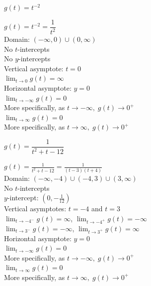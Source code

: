 \documentclass{ximera}
\begin{document}
\begin{question}
\begin{problem}
\begin{solution}
\begin{center} 
\end{center}
\end{solution}
\end{problem} 

\begin{problem}
$g(t) = t^{-2}$

\begin{solution}
$g(t) = t^{-2} = \dfrac{1}{t^{2}}$\\
Domain: $(-\infty, 0) \cup (0, \infty)$\\
No $t$-intercepts\\
No $y$-intercepts\\
Vertical asymptote: $t = 0$\\
$\lim_{t \rightarrow 0} g(t) = \infty$ \\
Horizontal asymptote: $y = 0$\\
$\lim_{t \rightarrow -\infty} g(t) = 0$\\
More specifically, as $t \rightarrow -\infty, \; g(t) \rightarrow 0^{+}$\\
$\lim_{t \rightarrow \infty} g(t) = 0$\\
More specifically, as $t \rightarrow \infty, \; g(t) \rightarrow 0^{+}$\\

\begin{center} 
\end{center}
\end{solution}
\end{problem} 

\begin{problem}
$g(t) = \dfrac{1}{t^{2} + t - 12}$

\begin{solution}
$g(t) = \frac{1}{t^{2} + t - 12} = \frac{1}{(t - 3)(t + 4)}$\\
Domain: $(-\infty, -4) \cup (-4, 3) \cup (3, \infty)$\\
No $t$-intercepts\\
$y$-intercept: $(0, -\frac{1}{12})$\\
Vertical asymptotes: $t = -4$ and $t = 3$\\
$\lim_{t \rightarrow -4^{-}} g(t) = \infty$, $\lim_{t \rightarrow -4^{+}} g(t) = -\infty$ \\
$\lim_{t \rightarrow 3^{-}} g(t) = -\infty$, $\lim_{t \rightarrow 3^{+}} g(t) = \infty$ \\
Horizontal asymptote: $y = 0$\\
$\lim_{t \rightarrow -\infty} g(t) = 0$\\
More specifically, as $t \rightarrow -\infty, \; g(t) \rightarrow 0^{+}$\\
$\lim_{t \rightarrow \infty} g(t) = 0$\\
More specifically, as $t \rightarrow \infty, \; g(t) \rightarrow 0^{+}$\\


\end{solution}
\end{problem}
\end{question}
\end{document}
